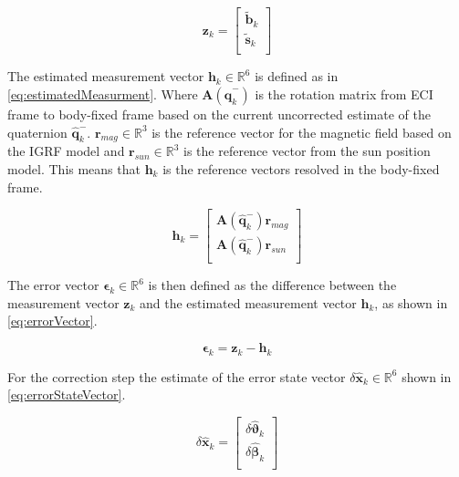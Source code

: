 \begin{equation}\label{eq:measurment}
	\boldsymbol{z}_k = \begin{bmatrix}
		\tilde{\boldsymbol{b}}_k \\
		\tilde{\boldsymbol{s}}_k \\
	\end{bmatrix}
\end{equation}  

The estimated measurement vector $\boldsymbol{h}_k \in \mathbb{R}^{6}$ is defined as in \autoref{eq:estimatedMeasurment}. Where $\boldsymbol{A}(\hat{\boldsymbol{q}}^-_k)$ is the rotation matrix from ECI frame to body-fixed frame based on the current uncorrected estimate of the quaternion $\hat{\boldsymbol{q}}^-_k$. $\boldsymbol{r}_{mag} \in \mathbb{R}^{3}$ is the reference vector for the magnetic field based on the IGRF model and $\boldsymbol{r}_{sun} \in \mathbb{R}^{3}$ is the reference vector from the sun position model. This means that $\boldsymbol{h}_k$ is the reference vectors resolved in the body-fixed frame.   

\begin{equation}\label{eq:estimatedMeasurment}
	\boldsymbol{h}_k = \begin{bmatrix}
		\boldsymbol{A}(\hat{\boldsymbol{q}}^-_k)\boldsymbol{r}_{mag} \\
		\boldsymbol{A}(\hat{\boldsymbol{q}}^-_k)\boldsymbol{r}_{sun} \\
	\end{bmatrix}
\end{equation}

The error vector $\boldsymbol{\epsilon}_k \in \mathbb{R}^{6}$ is then defined as the difference between the measurement vector $\boldsymbol{z}_k$ and the estimated measurement vector $\boldsymbol{h}_k$, as shown in \autoref{eq:errorVector}. 

\begin{equation}\label{eq:errorVector}
	\boldsymbol{\epsilon}_k = \boldsymbol{z}_k - \boldsymbol{h}_k
\end{equation}  

For the correction step the estimate of the error state vector $\delta\hat{\boldsymbol{x}}_k \in \mathbb{R}^{6}$ shown in \autoref{eq:errorStateVector}.       

\begin{equation}\label{eq:errorStateVector}
	\delta\hat{\boldsymbol{x}}_k = \begin{bmatrix}
		\delta\hat{\boldsymbol{\vartheta}}_k \\
		\delta\hat{\boldsymbol{\beta}}_k \\
	\end{bmatrix}
\end{equation} 

